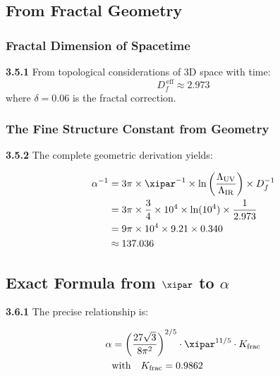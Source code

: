 	\subsection{From Fractal Geometry}
	
	\subsubsection{Fractal Dimension of Spacetime}
	
	\noindent \textbf{3.5.1} From topological considerations of 3D space with time:
	\begin{equation}
		D_f^{\,\text{eff}} \approx 2.973
	\end{equation}
	where $\delta = 0.06$ is the fractal correction.
	
	\subsubsection{The Fine Structure Constant from Geometry}
	
	\noindent \textbf{3.5.2} The complete geometric derivation yields:
	\begin{keyresult}
		\begin{align}
			\alpha^{-1} &= 3\pi \times \xipar^{-1} \times \ln\left(\frac{\Lambda_{\text{UV}}}{\Lambda_{\text{IR}}}\right) \times D_f^{-1} \\
			&= 3\pi \times \frac{3}{4} \times 10^{4} \times \ln(10^{4}) \times \frac{1}{2.973} \\
			&= 9\pi \times 10^{4} \times 9.21 \times 0.340 \\
			&\approx 137.036
		\end{align}
	\end{keyresult}
	
	\subsection{Exact Formula from $\xipar$ to $\alpha$}
	
	\noindent \textbf{3.6.1} The precise relationship is:
	\begin{keyresult}
		\begin{align}
			\alpha &= \left( \frac{27 \sqrt{3}}{8 \pi^2} \right)^{2/5} \cdot \xipar^{11/5} \cdot K_{\text{frac}} \\
			&\text{with} \quad K_{\text{frac}} = 0.9862
		\end{align}
	\end{keyresult}
	
